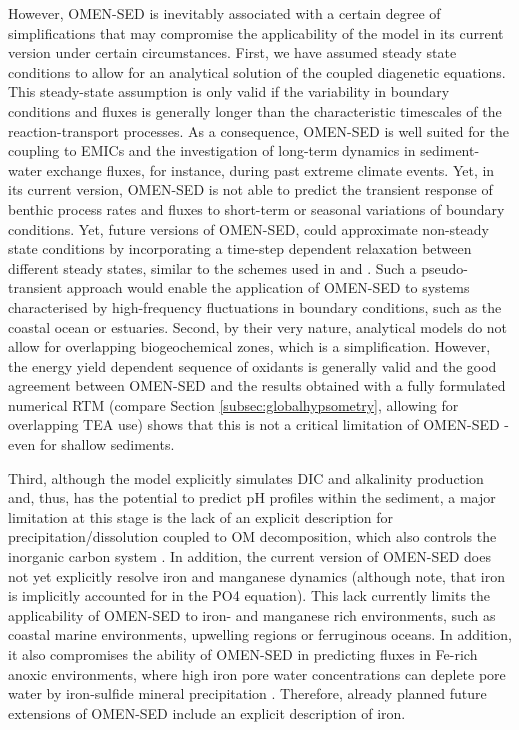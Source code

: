 \documentclass[gmd, manuscript]{copernicus}
\begin{document}
However, OMEN-SED is inevitably associated with a certain degree of simplifications that may compromise the applicability of the model in its current version under certain circumstances. 
First, we have assumed steady state conditions to allow for an analytical solution of the coupled diagenetic equations. This steady-state assumption is only valid if the variability in boundary conditions and fluxes is generally longer 
than the characteristic timescales of the reaction-transport processes. As a consequence, OMEN-SED is well suited for the coupling to EMICs and the investigation of long-term dynamics in sediment-water exchange fluxes, for instance, 
during past extreme climate events. Yet, in its current version, OMEN-SED is not able to predict the transient response of benthic process rates and fluxes to short-term or seasonal variations of boundary conditions. Yet, future versions of 
OMEN-SED, could approximate non-steady state conditions by incorporating a time-step dependent relaxation between different steady states, similar to the schemes used in \citet{ruardij_benthic_1995} and \citet{arndt_model_2007}. 
Such a pseudo-transient approach would enable the application of OMEN-SED to systems characterised by high-frequency fluctuations in boundary conditions, such as the coastal ocean or estuaries. 
Second, by their very nature, analytical models do not allow for overlapping biogeochemical zones, which is a simplification. However, the energy yield dependent sequence of oxidants is generally valid \citep[e.g.][]{hensen_benthic_2006} 
and the good agreement between OMEN-SED and the results obtained with a fully formulated numerical RTM (compare Section \ref{subsec:globalhypsometry}, allowing for overlapping TEA use) shows that this is not a critical limitation of OMEN-SED 
- even for shallow sediments.

Third, although the model explicitly simulates DIC and alkalinity production and, thus, has the potential to predict pH profiles within the sediment, a major limitation at this stage is the lack of an explicit description for  
precipitation/dissolution coupled to OM decomposition, which also controls the inorganic carbon system \citep{krumins_dissolved_2013}. In addition, the current version of OMEN-SED does not yet explicitly resolve iron and manganese dynamics
(although note, that iron is implicitly accounted for in the PO4 equation). This lack currently limits the applicability of OMEN-SED to iron- and manganese rich environments, such as coastal marine environments, upwelling regions or 
ferruginous oceans. In addition, it also compromises the ability of OMEN-SED in predicting  fluxes in Fe-rich anoxic environments, where high iron pore water concentrations can deplete pore water  by iron-sulfide mineral 
precipitation \citep[e.g.][]{meyers_production_2007}. Therefore, already planned future extensions of OMEN-SED include an explicit description of iron. 
\end{document}
